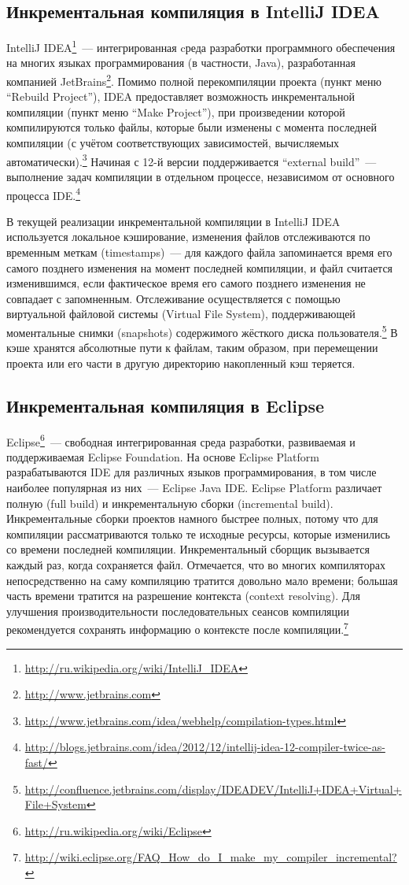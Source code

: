 \subsection{Инкрементальная компиляция в IntelliJ IDEA}
IntelliJ IDEA\footnote{\url{http://ru.wikipedia.org/wiki/IntelliJ_IDEA}}~--- интегрированная cреда разработки программного обеспечения на многих языках программирования (в частности, Java), разработанная компанией JetBrains\footnote{\url{http://www.jetbrains.com}}. Помимо полной перекомпиляции проекта (пункт меню ``Rebuild Project''), IDEA предоставляет возможность инкрементальной компиляции (пункт меню ``Make Project''), при произведении которой компилируются только файлы, которые были изменены с момента последней компиляции (с учётом соответствующих зависимостей, вычисляемых автоматически).\footnote{\url{http://www.jetbrains.com/idea/webhelp/compilation-types.html}} Начиная с 12-й версии поддерживается ``external build''~--- выполнение задач компиляции в отдельном процессе, независимом от основного процесса IDE.\footnote{\url{http://blogs.jetbrains.com/idea/2012/12/intellij-idea-12-compiler-twice-as-fast/}}

В текущей реализации инкрементальной компиляции в IntelliJ IDEA используется локальное кэширование, изменения файлов отслеживаются по временным меткам (timestamps)~--- для каждого файла запоминается время его самого позднего изменения на момент последней компиляции, и файл считается изменившимся, если фактическое время его самого позднего изменения не совпадает с запомненным. Отслеживание осуществляется с помощью виртуальной файловой системы (Virtual File System), поддерживающей моментальные снимки (snapshots) содержимого жёсткого диска пользователя.\footnote{\url{http://confluence.jetbrains.com/display/IDEADEV/IntelliJ+IDEA+Virtual+File+System}} В кэше хранятся абсолютные пути к файлам, таким образом, при перемещении проекта или его части в другую директорию накопленный кэш теряется.

\subsection{Инкрементальная компиляция в Eclipse}
Eclipse\footnote{\url{http://ru.wikipedia.org/wiki/Eclipse}}~--- свободная интегрированная среда разработки, развиваемая и поддерживаемая Eclipse Foundation. На основе Eclipse Platform разрабатываются IDE для различных языков программирования, в том числе наиболее популярная из них~--- Eclipse Java IDE.
Eclipse Platform различает полную (full build) и инкрементальную сборки (incremental build). Инкрементальные сборки проектов намного быстрее полных, потому что для компиляции рассматриваются только те исходные ресурсы, которые изменились со времени последней компиляции.
Инкрементальный сборщик вызывается каждый раз, когда сохраняется файл. Отмечается, что во многих компиляторах непосредственно на саму компиляцию тратится довольно мало времени; большая часть времени тратится на разрешение контекста (context resolving). Для улучшения производительности последовательных сеансов компиляции рекомендуется сохранять информацию о контексте после компиляции.\footnote{\url{http://wiki.eclipse.org/FAQ_How_do_I_make_my_compiler_incremental?}}

